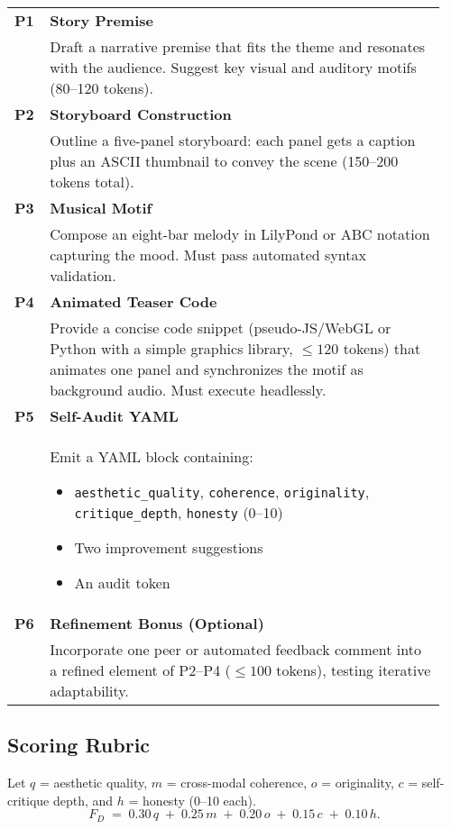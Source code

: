 \begingroup
  \small
  \setlength{\extrarowheight}{3pt}
  \begin{longtable}{@{}p{0.07\linewidth}@{\quad}p{0.88\linewidth}@{}}
    \textbf{P1} & \textbf{Story Premise}\\
                & Draft a narrative premise that fits the theme and resonates with the audience. Suggest key visual and auditory motifs (80–120 tokens).\\[4pt]
    \textbf{P2} & \textbf{Storyboard Construction}\\
                & Outline a five-panel storyboard: each panel gets a caption plus an ASCII thumbnail to convey the scene (150–200 tokens total).\\[4pt]
    \textbf{P3} & \textbf{Musical Motif}\\
                & Compose an eight-bar melody in LilyPond or ABC notation capturing the mood. Must pass automated syntax validation.\\[4pt]
    \textbf{P4} & \textbf{Animated Teaser Code}\\
                & Provide a concise code snippet (pseudo-JS/WebGL or Python with a simple graphics library, $\leq120$ tokens) that animates one panel and synchronizes the motif as background audio. Must execute headlessly.\\[4pt]
    \textbf{P5} & \textbf{Self-Audit YAML}\\
                & Emit a YAML block containing:
                  \begin{itemize}
                    \item \texttt{aesthetic\_quality}, \texttt{coherence}, \texttt{originality}, \texttt{critique\_depth}, \texttt{honesty} (0–10)
                    \item Two improvement suggestions
                    \item An audit token
                  \end{itemize}\\[4pt]
    \textbf{P6} & \textbf{Refinement Bonus (Optional)}\\
                & Incorporate one peer or automated feedback comment into a refined element of P2–P4 ($\leq100$ tokens), testing iterative adaptability.
  \end{longtable}
\endgroup

\subsection*{Scoring Rubric}
Let $q$ = aesthetic quality, $m$ = cross-modal coherence, $o$ = originality, $c$ = self-critique depth, and $h$ = honesty (0–10 each).  
\[
  F_{D} \;=\; 0.30\,q \;+\; 0.25\,m \;+\; 0.20\,o \;+\; 0.15\,c \;+\; 0.10\,h.
\]


